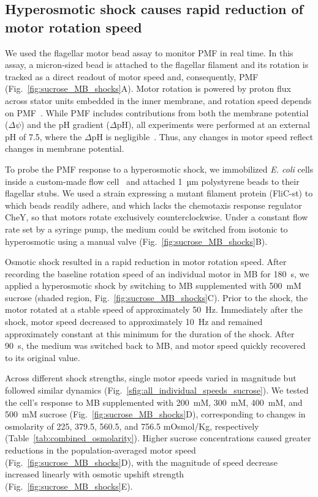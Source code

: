 \documentclass[twocolumn]{biophys-new}%
\begin{document}
 

\subsection*{Hyperosmotic shock causes rapid reduction of motor rotation speed}

We used the flagellar motor bead assay to monitor PMF in real time. In this assay, a micron-sized bead is attached to the flagellar filament and its rotation is tracked as a direct readout of motor speed and, consequently, PMF (Fig.~\ref{fig:sucrose_MB_shocks}A). Motor rotation is powered by proton flux across stator units embedded in the inner membrane, and rotation speed depends on PMF~\cite{GABEL2003l,Krasnopeeva2024}. While PMF includes contributions from both the membrane potential ($\Delta\psi$) and the pH gradient ($\Delta$pH), all experiments were performed at an external pH of 7.5, where the $\Delta \text{pH}$ is negligible~\cite{padan1976,slonczewski1981}. Thus, any changes in motor speed reflect changes in membrane potential.

To probe the PMF response to a hyperosmotic shock, we immobilized \textit{E. coli} cells inside a custom-made flow cell~\cite{beg_block} and attached 1~µm polystyrene beads to their flagellar stubs. We used a strain expressing a mutant filament protein (FliC-st) to which beads readily adhere, and which lacks the chemotaxis response regulator CheY, so that motors rotate exclusively counterclockwise. Under a constant flow rate set by a syringe pump, the medium could be switched from isotonic to hyperosmotic using a manual valve (Fig.~\ref{fig:sucrose_MB_shocks}B).

Osmotic shock resulted in a rapid reduction in motor rotation speed. After recording the baseline rotation speed of an individual motor in MB for 180~s, we applied a hyperosmotic shock by switching to MB supplemented with 500~mM sucrose (shaded region, Fig.~\ref{fig:sucrose_MB_shocks}C). Prior to the shock, the motor rotated at a stable speed of approximately 50~Hz. Immediately after the shock, motor speed decreased to approximately 10~Hz and remained approximately constant at this minimum for the duration of the shock. After 90~s, the medium was switched back to MB, and motor speed quickly recovered to its original value.

Across different shock strengths, single  motor speeds varied in magnitude but followed similar dynamics (Fig.~\ref{sfig:all_individual_speeds_sucrose}). We tested the cell’s response to MB supplemented with 200~mM, 300~mM, 400~mM, and 500~mM sucrose (Fig.~\ref{fig:sucrose_MB_shocks}D), corresponding to changes in osmolarity of 225, 379.5, 560.5, and 756.5 mOsmol/Kg, respectively (Table~\ref{tab:combined_osmolarity}). Higher sucrose concentrations caused greater reductions in the population-averaged motor speed (Fig.~\ref{fig:sucrose_MB_shocks}D), with the magnitude of speed decrease increased linearly with osmotic upshift strength (Fig.~\ref{fig:sucrose_MB_shocks}E). 
\end{document}
